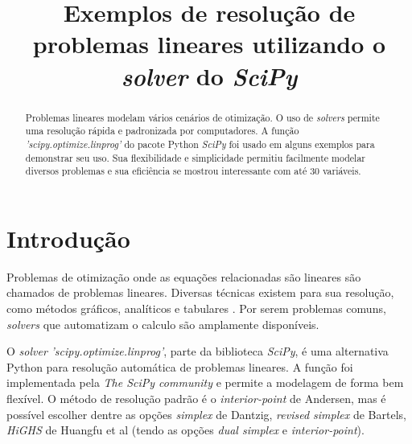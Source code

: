 \documentclass[conference,compsoc]{IEEEtran}
\begin{document}
\title{Exemplos de resolução de problemas lineares utilizando o \textit{solver} do \textit{SciPy}}

\author{
\and
{}
\and
{}
}

\maketitle

\begin{abstract}
Problemas lineares modelam vários cenários de otimização. O uso de \textit{solvers} permite uma resolução rápida e padronizada por computadores. A função \textit{'scipy.optimize.linprog'} do pacote Python \textit{SciPy} foi usado em alguns exemplos para demonstrar seu uso. Sua flexibilidade e simplicidade permitiu facilmente modelar diversos problemas e sua eficiência se mostrou interessante com até 30 variáveis.
\end{abstract}



\IEEEpeerreviewmaketitle
\section{Introdução} \label{sec_intro}

Problemas de otimização onde as equações relacionadas são lineares são chamados de problemas lineares. Diversas técnicas existem para sua resolução, como métodos gráficos, analíticos e tabulares \cite{livro}. Por serem problemas comuns, \textit{solvers} que automatizam o calculo são amplamente disponíveis.

O \textit{solver} \textit{'scipy.optimize.linprog'}, parte da biblioteca \textit{SciPy}, é uma alternativa Python para resolução automática de problemas lineares. A função foi implementada pela \textit{The SciPy community} e permite a modelagem de forma bem flexível. O método de resolução padrão é o \textit{interior-point} de Andersen, mas é possível escolher dentre as opções \textit{simplex} de Dantzig, \textit{revised simplex} de Bartels, \textit{HiGHS} de Huangfu et al (tendo as opções \textit{dual simplex} e \textit{interior-point}). \cite{solver}
\end{document}
